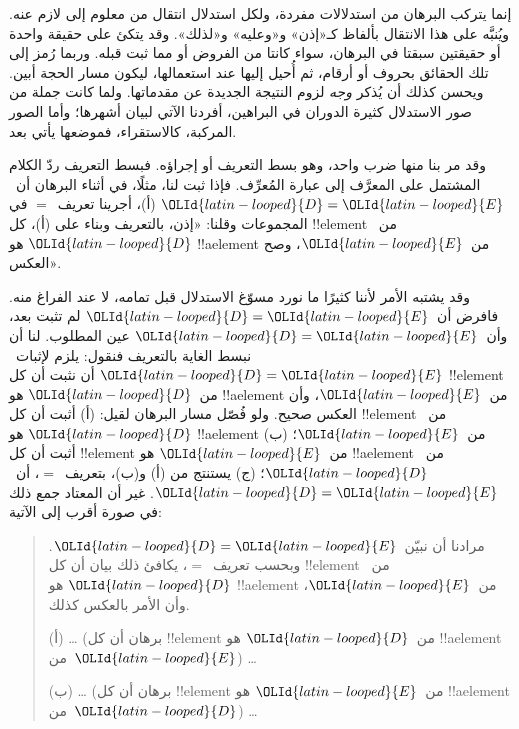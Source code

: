 \documentclass[../../../include/open-logic-section]{subfiles}
\begin{document}


إنما يتركب البرهان من استدلالات مفردة، ولكل استدلال انتقال من معلوم
إلى لازم عنه. ويُنبَّه على هذا الانتقال بألفاظ كـ«إذن» و«وعليه»
و«لذلك». وقد يتكئ على حقيقة واحدة أو حقيقتين سبقتا في البرهان، سواء
كانتا من الفروض أو مما ثبت قبله. وربما رُمز إلى تلك الحقائق بحروف أو
أرقام، ثم أُحيل إليها عند استعمالها، ليكون مسار الحجة أبين. ويحسن
كذلك أن يُذكر \emph{وجه} لزوم النتيجة الجديدة عن مقدماتها. ولما كانت
جملة من صور الاستدلال كثيرة الدوران في البراهين، أفردنا الآتي لبيان
أشهرها؛ وأما الصور المركبة، كالاستقراء، فموضعها يأتي بعد.

وقد مر بنا منها ضرب واحد، وهو بسط التعريف أو إجراؤه. فبسط التعريف ردّ
الكلام المشتمل على المعرَّف إلى عبارة المُعرِّف. فإذا ثبت لنا، مثلًا،
في أثناء البرهان أن~$\OLId{latin-looped}{D} = \OLId{latin-looped}{E}$ (أ)، أجرينا تعريف~$=$ في المجموعات وقلنا:
«إذن، بالتعريف وبناء على (أ)، كل !!{element} من~$\OLId{latin-looped}{D}$ هو !!a{element}
من~$\OLId{latin-looped}{E}$، وصح العكس».

وقد يشتبه الأمر لأننا كثيرًا ما نورد مسوّغ الاستدلال قبل تمامه، لا
عند الفراغ منه. فافرض أن~$\OLId{latin-looped}{D} = \OLId{latin-looped}{E}$ لم تثبت بعد، وأن~$\OLId{latin-looped}{D} = \OLId{latin-looped}{E}$ عين
المطلوب. لنا أن نبسط الغاية بالتعريف فنقول: يلزم لإثبات~$\OLId{latin-looped}{D} = \OLId{latin-looped}{E}$ أن نثبت أن كل
!!{element} من~$\OLId{latin-looped}{D}$ هو !!a{element} من~$\OLId{latin-looped}{E}$، وأن العكس صحيح. ولو فُصّل
مسار البرهان لقيل: (أ) أثبت أن كل !!{element} من~$\OLId{latin-looped}{D}$ هو !!a{element}
من~$\OLId{latin-looped}{E}$؛ (ب) أثبت أن كل !!{element} من~$\OLId{latin-looped}{E}$ هو !!a{element} من~$\OLId{latin-looped}{D}$؛
(ج) يستنتج من (أ) و(ب)، بتعريف~$=$، أن~$\OLId{latin-looped}{D} = \OLId{latin-looped}{E}$. غير أن المعتاد جمع
ذلك في صورة أقرب إلى الآتية:
\begin{quote}
مرادنا أن نبيّن~$\OLId{latin-looped}{D} = \OLId{latin-looped}{E}$. وبحسب تعريف~$=$، يكافئ ذلك بيان أن كل
!!{element} من~$\OLId{latin-looped}{D}$ هو !!a{element} من~$\OLId{latin-looped}{E}$، وأن الأمر بالعكس كذلك.

(أ) \dots{} (برهان أن كل !!{element} من~$\OLId{latin-looped}{D}$ هو !!a{element} من~$\OLId{latin-looped}{E}$)
\dots

(ب) \dots{} (برهان أن كل !!{element} من~$\OLId{latin-looped}{E}$ هو !!a{element} من~$\OLId{latin-looped}{D}$)
\dots
\end{quote}
\end{document}
